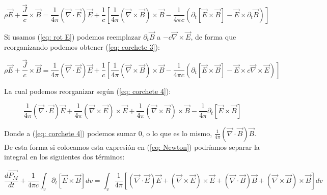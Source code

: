 \documentclass[]{article}
\begin{document}
\begin{equation}
    \rho \vec{E} + \frac{\vec{J}}{c} \times \vec{B} =
    \frac{1}{4 \pi} (\vec{\nabla} \cdot \vec{E})\vec{E} + \frac{1}{c} \left[
        \frac{1}{4 \pi} (\vec{\nabla} \times \vec{B}) \times \vec{B} -
        \frac{1}{4 \pi c} (\partial_t \left[\vec{E} \times \vec{B}\right] - \vec{E} \times \partial_t \vec{B})
    \right]
    \label{eq: corchete 2}
\end{equation}

Si usamos (\ref{eq: rot E}) podemos reemplazar $\partial_t \vec{B}$ a $-c \vec{\nabla} \times \vec{E}$, 
de forma que reorganizando podemos obtener (\ref{eq: corchete 3}):

\begin{equation}
    \rho \vec{E} + \frac{\vec{J}}{c} \times \vec{B} =
    \frac{1}{4 \pi} (\vec{\nabla} \cdot \vec{E})\vec{E} + \frac{1}{c} \left[
        \frac{1}{4 \pi} (\vec{\nabla} \times \vec{B}) \times \vec{B} -
        \frac{1}{4 \pi c} (\partial_t \left[\vec{E} \times \vec{B}\right] - 
        \vec{E} \times c \vec{\nabla} \times \vec{E})
    \right]
    \label{eq: corchete 3}
\end{equation}

La cual podemos reorganizar según (\ref{eq: corchete 4}):

\begin{equation}
    \frac{1}{4 \pi} (\vec{\nabla} \cdot \vec{E})\vec{E} + 
    \frac{1}{4 \pi} (\vec{\nabla} \times \vec{E}) \times \vec{E} +
    \frac{1}{4 \pi} (\vec{\nabla} \times \vec{B}) \times \vec{B} -
    \frac{1}{4 \pi} \partial_t \left[ \vec{E} \times \vec{B} \right]
    \label{eq: corchete 4}
\end{equation}

Donde a (\ref{eq: corchete 4}) podemos sumar $0$, o lo que es lo mismo, 
$\frac{1}{4 \pi} (\vec{\nabla} \cdot \vec{B})\vec{B}$. De esta forma si colocamos esta expresión en
(\ref{eq: Newton}) podríamos separar la integral en los siguientes dos términos:

\begin{equation}
    \frac{d\vec{P_{M}}}{dt} + \frac{1}{4 \pi c} \int_{v}^{} \partial_t \left[
    \vec{E} \times \vec{B}
    \right] dv = 
    \int_{v}^{} \frac{1}{4 \pi} \left[
    (\vec{\nabla} \cdot \vec{E})\vec{E} + 
    (\vec{\nabla} \times \vec{E}) \times \vec{E} +
    (\vec{\nabla} \cdot \vec{B})\vec{B} +
    (\vec{\nabla} \times \vec{B}) \times \vec{B}
    \right] dv 
    \label{eq: Newton 2}
\end{equation}
\end{document}
